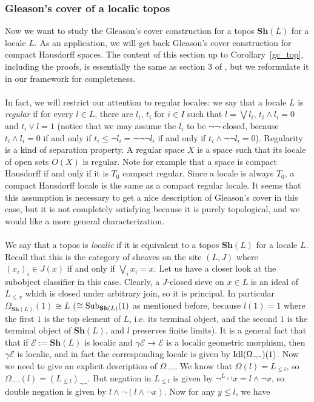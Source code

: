 \documentclass{article}
\begin{document}
\subsubsection{Gleason's cover of a localic topos}\label{gc_localic}
Now we want to study the Gleason's cover construction for a topos $\mathbf{Sh}(L)$ for a locale $L$. As an application, we will get back Gleason's cover construction for compact Hausdorff spaces. The content of this section up to Corollary~\ref{gc_top}, including the proofs, is essentially the same as section 3 of \cite{johnstone1980gleason}, but we reformulate it in our framework for completeness.\\
\\
In fact, we will restrict our attention to regular locales: we say that a locale $L$ is \emph{regular} if for every $l\in L$, there are $l_i,\,t_i$ for $i\in I$ such that $l=\bigvee l_i$, $t_i\land l_i=0$ and $t_i\vee l= 1$ (notice that we may assume the $l_i$ to be $\neg\neg$-closed, because $t_i\land l_i=0$ if and only if $t_i\leq\neg l_i=\neg\neg\neg l_i$ if and only if $t_i\land\neg\neg l_i=0$). Regularity is a kind of separation property. A regular space $X$ is a space such that its locale of open sets $O(X)$ is regular. Note for example that a space is compact Hausdorff if and only if it is $T_0$ compact regular. Since a locale is always $T_0$, a compact Hausdorff locale is the same as a compact regular locale. It seems that this assumption is necessary to get a nice description of Gleason's cover in this case, but it is not completely satisfying because it is purely topological, and we would like a more general characterization. \\
\\
We say that a topos is \emph{localic} if it is equivalent to a topos $\mathbf{Sh}(L)$ for a locale $L$. Recall that this is the category of sheaves on the site $(L,J)$ where $(x_i)_i\in J(x)$ if and only if $\bigvee_i x_i=x$. Let us have a closer look at the subobject classifier in this case. Clearly, a $J$-closed sieve on $x\in L$ is an ideal of $L_{\leq x}$ which is closed under arbitrary join, so it is principal. In particular $\Omega_{\mathbf{Sh}(L)}(1)\cong L$ ($\cong \textup{Sub}_{\mathbf{Sh}(L)}(1)$ as mentioned before, because $l(1)=1$ where the first $1$ is the top element of $L$, i.e. its terminal object, and the second $1$ is the terminal object of $\mathbf{Sh}(L)$, and $l$ preserves finite limits). It is a general fact that that if $\mathcal{E}:=\mathbf{Sh}(L)$ is localic and $\gamma\mathcal{E}\xrightarrow{}\mathcal{E}$ is a localic geometric morphism, then $\gamma\mathcal{E}$ is localic, and in fact the corresponding locale is given by $\textup{Idl}(\Omega_{\neg\neg})(1)$. Now we need to give an explicit description of $\Omega_{\neg\neg}$. We know that $\Omega(l)=L_{\leq l}$, so $\Omega_{\neg\neg}(l)=(L_{\leq l})_{\neg\neg}$. But negation in $L_{\leq l}$ is given by $\neg^{L_{\leq l}}x=l\land\neg x$, so double negation is given by $l\land \neg(l\land\neg x)$. Now for any $y\leq l$, we have 
\end{document}
